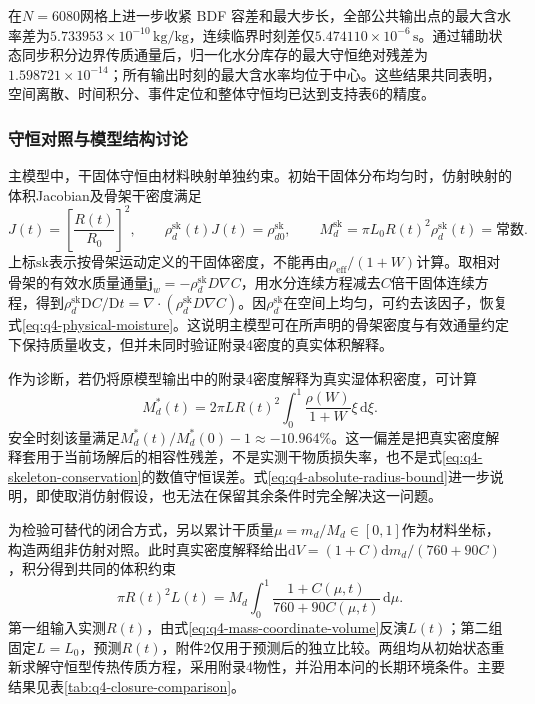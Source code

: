 \documentclass[withoutpreface,bwprint]{cumcmthesis}
\begin{document}
在$N=6080$网格上进一步收紧 BDF 容差和最大步长，全部公共输出点的最大含水率差为$5.733953\times10^{-10}\,\mathrm{kg/kg}$，连续临界时刻差仅$5.474110\times10^{-6}\,\mathrm s$。通过辅助状态同步积分边界传质通量后，归一化水分库存的最大守恒绝对残差为$1.598721\times10^{-14}$；所有输出时刻的最大含水率均位于中心。这些结果共同表明，空间离散、时间积分、事件定位和整体守恒均已达到支持表6的精度。

\subsubsection{守恒对照与模型结构讨论}
\label{sec:q4-conservation-comparison}

主模型中，干固体守恒由材料映射单独约束。初始干固体分布均匀时，仿射映射的体积Jacobian及骨架干密度满足
\begin{equation}
J(t)=\left[\frac{R(t)}{R_0}\right]^2,
\qquad
\rho_d^{\mathrm{sk}}(t)J(t)=\rho_{d0}^{\mathrm{sk}},
\qquad
M_d^{\mathrm{sk}}=\pi L_0R(t)^2\rho_d^{\mathrm{sk}}(t)=\text{常数}.
\label{eq:q4-skeleton-conservation}
\end{equation}
上标$\mathrm{sk}$表示按骨架运动定义的干固体密度，不能再由$\rho_{\mathrm{eff}}/(1+W)$计算。取相对骨架的有效水质量通量$\boldsymbol j_w=-\rho_d^{\mathrm{sk}}D\nabla C$，用水分连续方程减去$C$倍干固体连续方程，得到$\rho_d^{\mathrm{sk}}\mathrm DC/\mathrm Dt=\nabla\cdot(\rho_d^{\mathrm{sk}}D\nabla C)$。因$\rho_d^{\mathrm{sk}}$在空间上均匀，可约去该因子，恢复式\eqref{eq:q4-physical-moisture}。这说明主模型可在所声明的骨架密度与有效通量约定下保持质量收支，但并未同时验证附录4密度的真实体积解释。

作为诊断，若仍将原模型输出中的附录4密度解释为真实湿体积密度，可计算
\begin{equation}
M_d^*(t)
=2\pi L R(t)^2
\int_0^1\frac{\rho(W)}{1+W}\xi\,\mathrm d\xi.
\label{eq:q4-dry-mass-diagnostic}
\end{equation}
安全时刻该量满足$M_d^*(t)/M_d^*(0)-1\approx-10.964\%$。这一偏差是把真实密度解释套用于当前场解后的相容性残差，不是实测干物质损失率，也不是式\eqref{eq:q4-skeleton-conservation}的数值守恒误差。式\eqref{eq:q4-absolute-radius-bound}进一步说明，即使取消仿射假设，也无法在保留其余条件时完全解决这一问题。

为检验可替代的闭合方式，另以累计干质量$\mu=m_d/M_d\in[0,1]$作为材料坐标，构造两组非仿射对照。此时真实密度解释给出$\mathrm dV=(1+C)\mathrm dm_d/(760+90C)$，积分得到共同的体积约束
\begin{equation}
\pi R(t)^2L(t)
=M_d\int_0^1\frac{1+C(\mu,t)}{760+90C(\mu,t)}\,\mathrm d\mu.
\label{eq:q4-mass-coordinate-volume}
\end{equation}
第一组输入实测$R(t)$，由式\eqref{eq:q4-mass-coordinate-volume}反演$L(t)$；第二组固定$L=L_0$，预测$R(t)$，附件2仅用于预测后的独立比较。两组均从初始状态重新求解守恒型传热传质方程，采用附录4物性，并沿用本问的长期环境条件。主要结果见表\ref{tab:q4-closure-comparison}。
\end{document}
